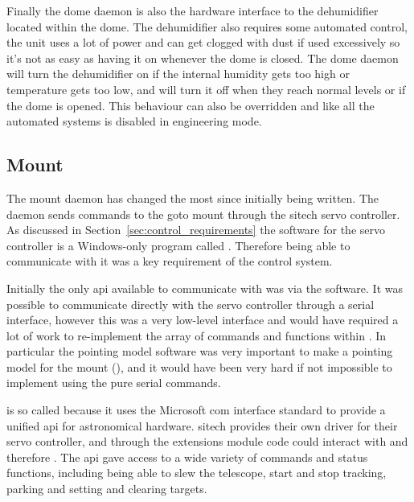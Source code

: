 \begin{colsection}
\begin{colsection}
Finally the dome daemon is also the hardware interface to the dehumidifier located within the dome. The dehumidifier also requires some automated control, the unit uses a lot of power and can get clogged with dust if used excessively so it's not as easy as having it on whenever the dome is closed. The dome daemon will turn the dehumidifier on if the internal humidity gets too high or temperature gets too low, and will turn it off when they reach normal levels or if the dome is opened. This behaviour can also be overridden and like all the automated systems is disabled in engineering mode.

\end{colsection}


\subsection{Mount}
\label{sec:mount}
\begin{colsection}

The mount daemon has changed the most since initially being written. The daemon sends commands to the \gls{goto} mount through the \gls{sitech} servo controller. As discussed in Section~\ref{sec:control_requirements} the software for the servo controller is a Windows-only program called . Therefore being able to communicate with it was a key requirement of the control system.

Initially the only \gls{api} available to communicate with  was via the  software. It was possible to communicate directly with the servo controller through a serial interface, however this was a very low-level interface and would have required a lot of work to re-implement the array of commands and functions within . In particular the  pointing model software was very important to make a pointing model for the mount (), and it would have been very hard if not impossible to implement using the pure serial commands.

 is so called because it uses the Microsoft \gls{com} interface standard to provide a unified \gls{api} for astronomical hardware. \gls{sitech} provides their own  driver for their servo controller, and through the   extensions module  code could interact with  and therefore . The  \gls{api} gave access to a wide variety of commands and status functions, including being able to slew the telescope, start and stop tracking, parking and setting and clearing targets.


\end{colsection}
\end{colsection}
